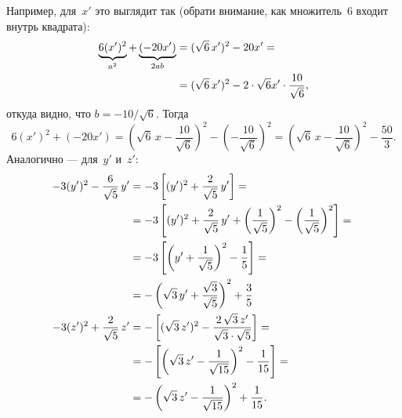 \begin{solution}
	Например, для~$x'$ это выглядит так (обрати внимание, как множитель~$6$ входит внутрь квадрата):
	\begin{align*}
		\underbrace{6(x')^2}_{a^2} + 
		\underbrace{(- 20x')}_{2ab} &=
		(\sqrt{6}\,x')^2 - 20x'
		= {} \\ {} &=
		(\sqrt{6}\,x')^2 -
		2 \cdot \sqrt{6} x' \cdot \frac{10}{\sqrt{6}},
	\end{align*}
	откуда видно, что $b = -10/\sqrt{6}$. Тогда
	\[
		6(x')^2 + 
		(- 20x') =
		\left( 
			\sqrt{6}\,x - \frac{10}{\sqrt{6}}
		\right)^2
		-
		\left( 
			- \frac{10}{\sqrt{6}}
		\right)^2
		=
		\left( 
			\sqrt{6}\,x - \frac{10}{\sqrt{6}}
		\right)^2
		-
		\frac{50}{3}
		.
	\]
	Аналогично --- для~$y'$ и~$z'$:
	\begin{align*}
		-3(y')^2 - \frac{6}{\sqrt{5}}\,y' &=
		-3
		\left[ 
			(y')^2 + \frac{2}{\sqrt{5}}\,y'
		\right]
		= {} \\ {} &=
		-3
		\left[ 
			(y')^2 + \frac{2}{\sqrt{5}}\,y' +
			\left( 
				\frac{1}{\sqrt{5}}
			\right)^2
			-
			\left( 
				\frac{1}{\sqrt{5}}
			\right)^2
		\right]
		= {} \\ {} &=
		-3
		\left[ 
			\left( 
				y' +
				\frac{1}{\sqrt{5}}
			\right)^2
			-
			\frac{1}{5}
		\right]
		= {} \\ {} &=
		-
		\left( 
			\sqrt{3}\,y' +
			\frac{\sqrt{3}}{\sqrt{5}}
		\right)^2
		+
		\frac{3}{5}
		\\
		-3(z')^2 + \frac{2}{\sqrt{5}}\,z' &=
		-
		\left[ 
			(\sqrt{3}\,z')^2 - \frac{2\,\sqrt{3}\,z'}{\sqrt{3} \cdot \sqrt{5}}
		\right]
		= {} \\ {} &=
		-
		\left[ 
			\left( 
				\sqrt{3}\,z' - \frac{1}{\sqrt{15}}
			\right)^2
			-
			\frac{1}{15}
		\right] = {} \\ {} &=
		-
		\left( 
			\sqrt{3}\,z' - \frac{1}{\sqrt{15}}
		\right)^2
		+
		\frac{1}{15}
		.
	\end{align*}


\end{solution}
